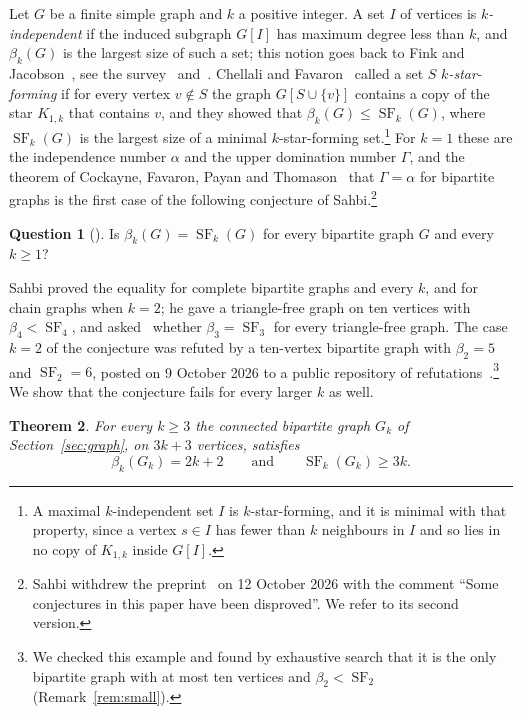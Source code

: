 \documentclass[11pt]{amsart}
\newtheorem{theorem}{Theorem}[section]
\theoremstyle{definition}
\newtheorem{question}[theorem]{Question}
\theoremstyle{remark}
\newcommand{\SF}{\operatorname{SF}}
\begin{document}
Let $G$ be a finite simple graph and $k$ a positive integer. A set $I$ of vertices is \emph{$k$-independent} if the induced subgraph $G[I]$ has maximum degree less than $k$, and $\beta_k(G)$ is the largest size of such a set; this notion goes back to Fink and Jacobson~\cite{FJ}, see the survey~\cite{CFHV} and~\cite{BCFM}. Chellali and Favaron~\cite{CF} called a set $S$ \emph{$k$-star-forming} if for every vertex $v\notin S$ the graph $G[S\cup\{v\}]$ contains a copy of the star $K_{1,k}$ that contains $v$, and they showed that $\beta_k(G)\le\SF_k(G)$, where $\SF_k(G)$ is the largest size of a minimal $k$-star-forming set.\footnote{A maximal $k$-independent set $I$ is $k$-star-forming, and it is minimal with that property, since a vertex $s\in I$ has fewer than $k$ neighbours in $I$ and so lies in no copy of $K_{1,k}$ inside $G[I]$.} For $k=1$ these are the independence number $\alpha$ and the upper domination number $\Gamma$, and the theorem of Cockayne, Favaron, Payan and Thomason~\cite{CFPT} that $\Gamma=\alpha$ for bipartite graphs is the first case of the following conjecture of Sahbi.\footnote{Sahbi withdrew the preprint~\cite{Sa} on 12 October 2026 with the comment ``Some conjectures in this paper have been disproved''. We refer to its second version.}

\begin{question}[{\cite[Conjecture~4.1]{Sa}}]
Is $\beta_k(G)=\SF_k(G)$ for every bipartite graph $G$ and every $k\ge1$?
\end{question}

Sahbi proved the equality for complete bipartite graphs and every $k$, and for chain graphs when $k=2$; he gave a triangle-free graph on ten vertices with $\beta_4<\SF_4$, and asked~\cite[Problem~7.3]{Sa} whether $\beta_3=\SF_3$ for every triangle-free graph. The case $k=2$ of the conjecture was refuted by a ten-vertex bipartite graph with $\beta_2=5$ and $\SF_2=6$, posted on 9 October 2026 to a public repository of refutations~\cite{OR}.\footnote{We checked this example and found by exhaustive search that it is the only bipartite graph with at most ten vertices and $\beta_2<\SF_2$ (Remark~\ref{rem:small}).} We show that the conjecture fails for every larger $k$ as well.

\begin{theorem}\label{thm:main}
For every $k\ge3$ the connected bipartite graph $G_k$ of Section~\ref{sec:graph}, on $3k+3$ vertices, satisfies
\[
\beta_k(G_k)=2k+2\qquad\text{and}\qquad \SF_k(G_k)\ge3k.
\]
\end{theorem}
\end{document}

